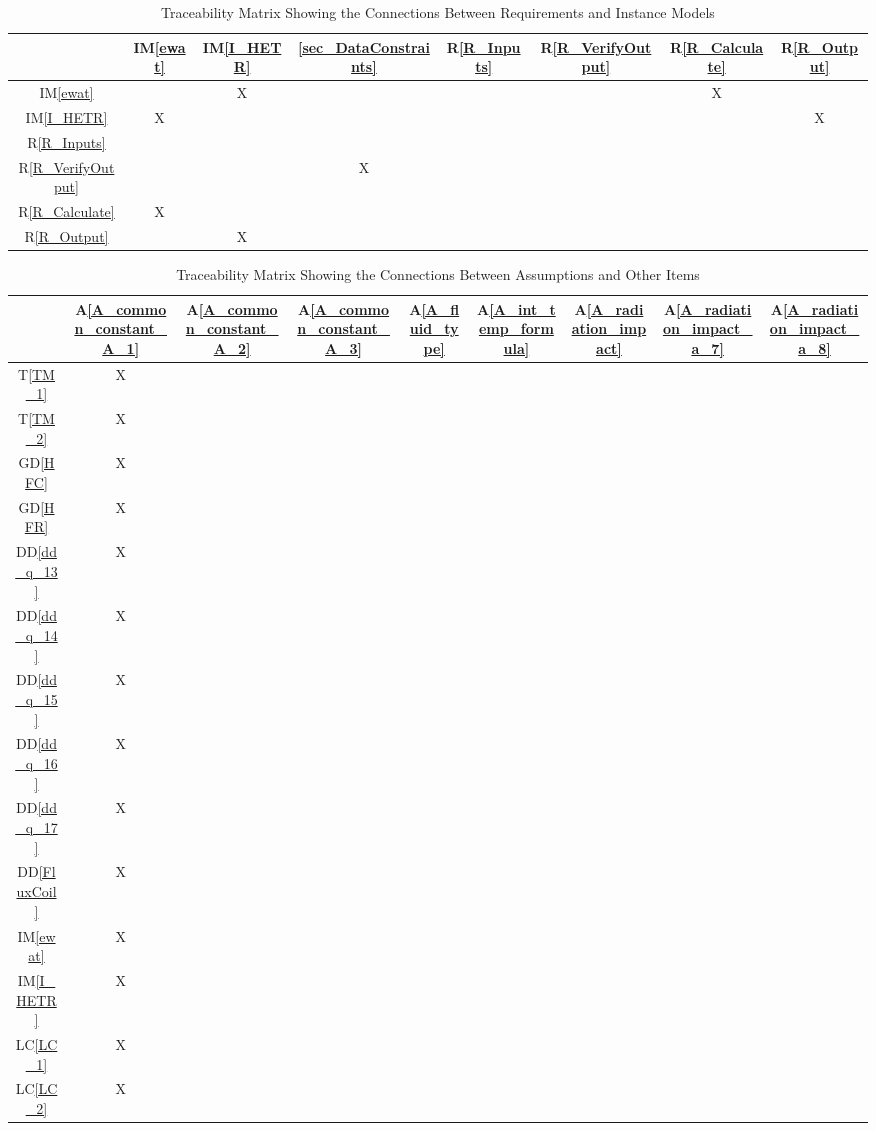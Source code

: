 \documentclass[12pt]{article}
\newcommand{\dref}[1]{GD\ref{#1}}
\newcommand{\ddref}[1]{DD\ref{#1}}
\newcommand{\tref}[1]{T\ref{#1}}
\newcommand{\aref}[1]{A\ref{#1}}
\newcommand{\iref}[1]{IM\ref{#1}}
\newcommand{\rref}[1]{R\ref{#1}}
\newcommand{\lcref}[1]{LC\ref{#1}}
\begin{document}
\begin{table}[h!]
\centering
\begin{tabular}{|c|c|c|c|c|c|c|c|}
\hline
	& \iref{ewat}& \iref{I_HETR}& \ref{sec_DataConstraints}& \rref{R_Inputs}& \rref{R_VerifyOutput} & \rref{R_Calculate} & \rref{R_Output} \\
\hline
\iref{ewat}            & & X& & & & X&  \\ \hline
\iref{I_HETR}            & X& & & & & & X \\ \hline
\rref{R_Inputs}     & & & & & & & \\ \hline
\rref{R_VerifyOutput}  & & & X& & & & \\ \hline
\rref{R_Calculate}    &X & & & & & & \\ \hline
\rref{R_Output}  & & X& & & & &  \\ 
\hline
\end{tabular}
\caption{Traceability Matrix Showing the Connections Between Requirements and Instance Models}
\label{Table:R_trace}
\end{table}



\begin{table}[h!]
\centering
\begin{tabular}{|c|c|c|c|c|c|c|c|c|}
\hline
	& \aref{A_common_constant_A_1}& \aref{A_common_constant_A_2}& \aref{A_common_constant_A_3}& \aref{A_fluid_type}& \aref{A_int_temp_formula}& \aref{A_radiation_impact}& \aref{A_radiation_impact_a_7}& \aref{A_radiation_impact_a_8} \\

 

\hline
\tref{TM_1}     & X& & & & & & &  \\ \hline
\tref{TM_2}     & X& & & & & & & \\ \hline
\dref{HFC}        & X& & & & & & &  \\ \hline
\dref{HFR}      & X& & & & & & &  \\ \hline
\ddref{dd_q_13} & X& & & & & & &  \\ \hline
\ddref{dd_q_14}  & X& & & & & & &  \\ \hline
\ddref{dd_q_15}    & X& & & & & & &  \\ \hline
\ddref{dd_q_16}     & X& & & & & & & \\ \hline
\ddref{dd_q_17}     & X& & & & & & &  \\ \hline
\ddref{FluxCoil}     & X& & & & & & &  \\ \hline
\iref{ewat}      & X& & & & & & &  \\ \hline
\iref{I_HETR}      & X& & & & & & &  \\ \hline
\lcref{LC_1}      & X& & & & & & &  \\ \hline
\lcref{LC_2}      & X& & & & & & &  \\ 

\hline
\end{tabular}
\caption{Traceability Matrix Showing the Connections Between Assumptions and Other Items}
\label{Table:A_trace}
~\newline
\end{table}
\end{document}

